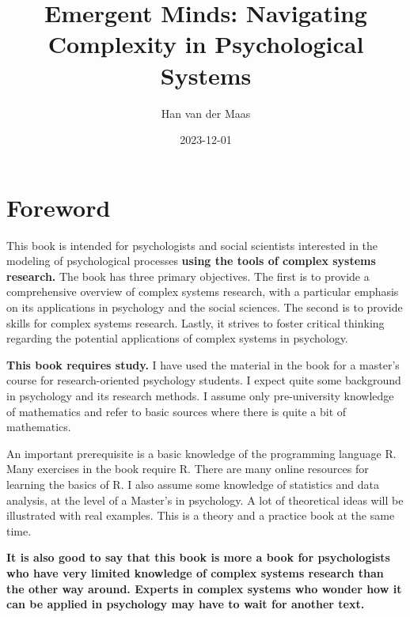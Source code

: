 \documentclass[
  letterpaper,
]{scrbook}
\title{Emergent Minds: Navigating Complexity in Psychological Systems}
\author{Han van der Maas}
\date{2023-12-01}
\renewcommand*\contentsname{Table of contents}
\newcommand\contentsname{Table of contents}
\begin{document}
\frontmatter
\maketitle
\ifdefined\Shaded\renewenvironment{Shaded}{\begin{tcolorbox}[breakable, interior hidden, borderline west={3pt}{0pt}{shadecolor}, boxrule=0pt, sharp corners, frame hidden, enhanced]}{\end{tcolorbox}}\fi

\renewcommand*\contentsname{Table of contents}
{
\setcounter{tocdepth}{7}
\tableofcontents
}
\mainmatter
{}

\hypertarget{foreword}{%
\chapter*{Foreword}\label{foreword}}


This book is intended for psychologists and social scientists interested
in the modeling of psychological processes \textbf{using the tools of
complex systems research.} The book has three primary objectives. The
first is to provide a comprehensive overview of complex systems
research, with a particular emphasis on its applications in psychology
and the social sciences. The second is to provide skills for complex
systems research. Lastly, it strives to foster critical thinking
regarding the potential applications of complex systems in psychology.

\textbf{This book requires study.} I have used the material in the book
for a master's course for research-oriented psychology students. I
expect quite some background in psychology and its research methods. I
assume only pre-university knowledge of mathematics and refer to basic
sources where there is quite a bit of mathematics.

An important prerequisite is a basic knowledge of the programming
language R. Many exercises in the book require R. There are many online
resources for learning the basics of R. I also assume some knowledge of
statistics and data analysis, at the level of a Master's in psychology.
A lot of theoretical ideas will be illustrated with real examples. This
is a theory and a practice book at the same time.

\textbf{It is also good to say that this book is more a book for
psychologists who have very limited knowledge of complex systems
research than the other way around. Experts in complex systems who
wonder how it can be applied in psychology may have to wait for another
text.}
\end{document}
